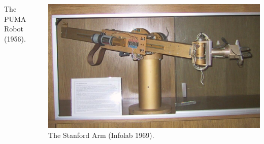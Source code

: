 \begin{frame}
\begin{columns}[t]
\begin{column}{5cm}
\begin{minipage}[b]{.5\textwidth}
					\footnotesize{The PUMA Robot (1956).} %
			\end{minipage}
		\end{column}	
		\begin{column}{5cm}
			\begin{minipage}[b]{.5\textwidth}
				\includegraphics[width=1.5\textwidth, height=1.5\textwidth]{../Notes/figures/StanfordArm.jpg}  \\
				\footnotesize The Stanford Arm (Infolab 1969). %
			\end{minipage}
		\end{column}
	\end{columns}
\end{frame}


